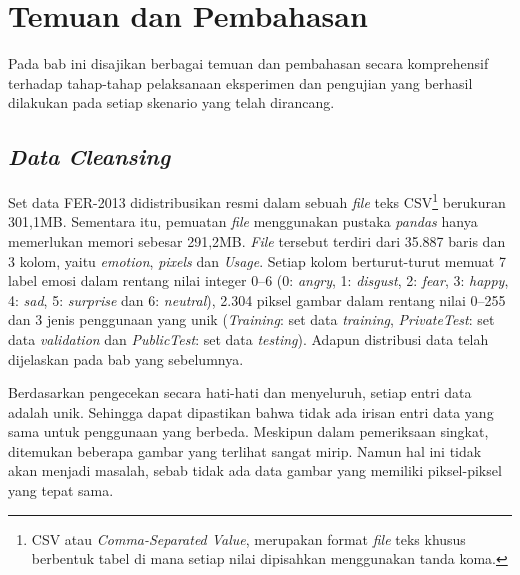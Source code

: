 \chapter{Temuan dan Pembahasan}
Pada bab ini disajikan berbagai temuan dan pembahasan secara komprehensif terhadap tahap-tahap pelaksanaan eksperimen dan pengujian yang berhasil dilakukan pada setiap skenario yang telah dirancang.

\section{\textit{Data Cleansing}}
Set data FER-2013 didistribusikan resmi dalam sebuah \textit{file} teks CSV\footnote{CSV atau \textit{Comma-Separated Value}, merupakan format \textit{file} teks khusus berbentuk tabel di mana setiap nilai dipisahkan menggunakan tanda koma.} berukuran 301,1MB. Sementara itu, pemuatan \textit{file} menggunakan pustaka \textit{pandas} hanya memerlukan memori sebesar 291,2MB. \textit{File} tersebut terdiri dari 35.887 baris dan 3 kolom, yaitu \textit{emotion}, \textit{pixels} dan \textit{Usage}. Setiap kolom berturut-turut memuat 7 label emosi dalam rentang nilai integer 0--6 (0: \textit{angry}, 1: \textit{disgust}, 2: \textit{fear}, 3: \textit{happy}, 4: \textit{sad}, 5: \textit{surprise} dan 6: \textit{neutral}), 2.304 piksel gambar dalam rentang nilai 0--255 dan 3 jenis penggunaan yang unik (\textit{Training}: set data \textit{training}, \textit{PrivateTest}: set data \textit{validation} dan \textit{PublicTest}: set data \textit{testing}). Adapun distribusi data telah dijelaskan pada bab yang sebelumnya.

Berdasarkan pengecekan secara hati-hati dan menyeluruh, setiap entri data adalah unik. Sehingga dapat dipastikan bahwa tidak ada irisan entri data yang sama untuk penggunaan yang berbeda. Meskipun dalam pemeriksaan singkat, ditemukan beberapa gambar yang terlihat sangat mirip. Namun hal ini tidak akan menjadi masalah, sebab tidak ada data gambar yang memiliki piksel-piksel yang tepat sama.

